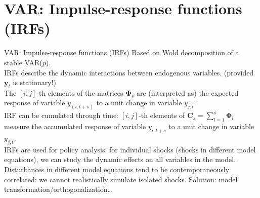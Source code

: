 \documentclass[usenames,dvipsnames]{beamer}
\begin{document}
\section{VAR: Impulse-response functions (IRFs)}
\begin{frame}{VAR: Impulse-response functions (IRFs)}
\small
Based on Wold decomposition of a stable VAR($p$).\\
\vspace*{3mm}
IRFs describe the dynamic interactions between endogenous variables. (provided $\bm{y}_t$ is stationary!)\\
\vspace*{3mm}
The $[i, j]$-th elements of the matrices $\bm{\Phi}_s$ are (interpreted as) the expected response of variable $y_{(i,t+s)}$ to a unit change in variable $y_{j,t}$.\\
\vspace*{3mm}
IRF can be cumulated through time: $[i, j]$-th elements of  $\bm{C}_s = \sum_{l=1}^s \bm{\Phi}_l$ measure the accumulated response of variable $y_{i, t+s}$ to a unit change in variable $y_{j,t}$.\\
\vspace*{3mm}
IRFs are used for policy analysis: for individual shocks (shocks in different model equations), we can study the dynamic effects on all variables in the model.\\
\vspace*{3mm}
Disturbances in different model equations tend to be  contemporaneously correlated: we cannot realistically simulate isolated shocks. Solution: model transformation/orthogonalization\dots
\end{frame}
\end{document}
